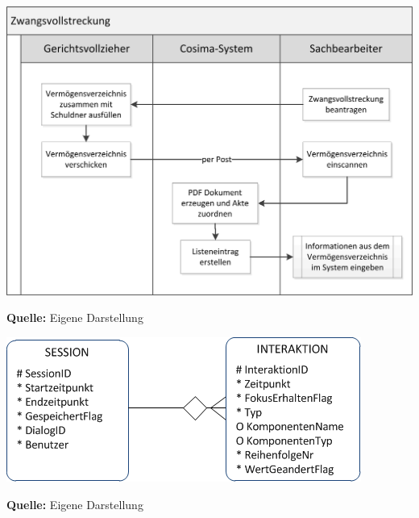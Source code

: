 \label{sec:ablaufZwangsvollstreckung}
\begin{minipage}{\textwidth}
  \centering
  \includegraphics{img/Zwangsvollstreckung_Prozess.png}
  \caption*{\textbf{Quelle:} Eigene Darstellung}
  \label{fig:zwangsvollstreckungProzess}
\end{minipage}

\label{sec:ermUIDataCollector}
\begin{minipage}{\textwidth}
  \centering
  \includegraphics[scale=0.9]{img/ERM_UIDataCollector.PNG}
  \caption*{\textbf{Quelle:} Eigene Darstellung}
  \label{fig:ermUIDataCollector}
\end{minipage}

\label{sec:beispielVermoegensverzeichnisFormular}


